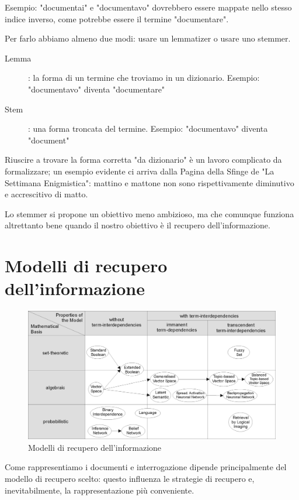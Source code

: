 Esempio: "documentai" e "documentavo" dovrebbero essere mappate nello stesso indice inverso, come potrebbe essere il termine "documentare".

Per farlo abbiamo almeno due modi: usare un lemmatizer o usare uno stemmer.

\begin{description}
    \item[Lemma]: la forma di un termine che troviamo in un dizionario. \newline
    Esempio: "documentavo" diventa "documentare"
    \item[Stem]: una forma troncata del termine. \newline
    Esempio: "documentavo" diventa "document"
\end{description}

Riuscire a trovare la forma corretta "da dizionario" è un lavoro complicato da formalizzare; un esempio evidente ci arriva dalla Pagina della Sfinge de "La Settimana Enigmistica": mattino e mattone non sono rispettivamente diminutivo e accrescitivo di matto.

Lo stemmer si propone un obiettivo meno ambizioso, ma che comunque funziona altrettanto bene quando il nostro obiettivo è il recupero dell'informazione.

\newpage

\section{Modelli di recupero dell'informazione}
\begin{figure}
    \centering
    \includegraphics[scale=0.70]{immagini/Information-Retrieval-Models.png}
    \caption{Modelli di recupero dell'informazione}
 \end{figure}
Come rappresentiamo i documenti e interrogazione dipende principalmente del modello di recupero scelto: questo influenza le strategie di recupero e, inevitabilmente, la rappresentazione più conveniente.

